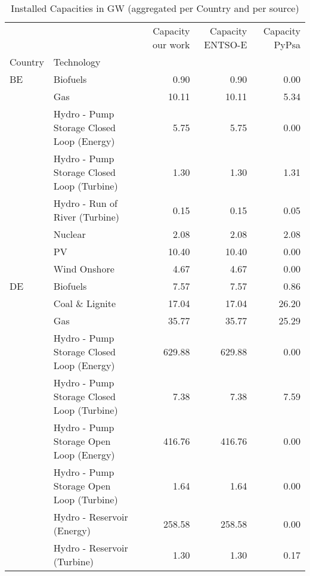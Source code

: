 \begin{table}
\centering
\caption{Installed Capacities in GW (aggregated per Country and per source)}
\begin{tabular}{llrrr}
\toprule
   &              &  Capacity our work &  Capacity ENTSO-E &  Capacity PyPsa \\
Country & Technology &                    &                   &                 \\
\midrule
BE & Biofuels &               0.90 &              0.90 &            0.00 \\
   & Gas &              10.11 &             10.11 &            5.34 \\
   & Hydro - Pump Storage Closed Loop (Energy) &               5.75 &              5.75 &            0.00 \\
   & Hydro - Pump Storage Closed Loop (Turbine) &               1.30 &              1.30 &            1.31 \\
   & Hydro - Run of River (Turbine) &               0.15 &              0.15 &            0.05 \\
   & Nuclear &               2.08 &              2.08 &            2.08 \\
   & PV &              10.40 &             10.40 &            0.00 \\
   & Wind Onshore &               4.67 &              4.67 &            0.00 \\
DE & Biofuels &               7.57 &              7.57 &            0.86 \\
   & Coal \& Lignite &              17.04 &             17.04 &           26.20 \\
   & Gas &              35.77 &             35.77 &           25.29 \\
   & Hydro - Pump Storage Closed Loop (Energy) &             629.88 &            629.88 &            0.00 \\
   & Hydro - Pump Storage Closed Loop (Turbine) &               7.38 &              7.38 &            7.59 \\
   & Hydro - Pump Storage Open Loop (Energy) &             416.76 &            416.76 &            0.00 \\
   & Hydro - Pump Storage Open Loop (Turbine) &               1.64 &              1.64 &            0.00 \\
   & Hydro - Reservoir (Energy) &             258.58 &            258.58 &            0.00 \\
   & Hydro - Reservoir (Turbine) &               1.30 &              1.30 &            0.17 \\

\end{tabular}
\end{table}
